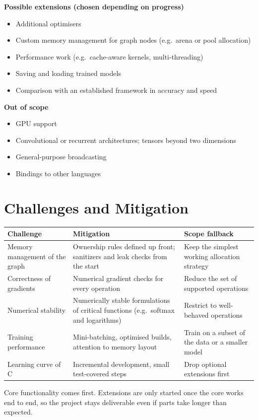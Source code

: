 \documentclass[11pt,a4paper]{article}
\begin{document}
\textbf{Possible extensions (chosen depending on progress)}
\begin{itemize}
  \item Additional optimisers
  \item Custom memory management for graph nodes (e.g.\ arena or pool allocation)
  \item Performance work (e.g.\ cache-aware kernels, multi-threading)
  \item Saving and loading trained models
  \item Comparison with an established framework in accuracy and speed
\end{itemize}

\textbf{Out of scope}
\begin{itemize}
  \item GPU support
  \item Convolutional or recurrent architectures; tensors beyond two dimensions
  \item General-purpose broadcasting
  \item Bindings to other languages
\end{itemize}

\section{Challenges and Mitigation}

{\small
\begin{longtable}{@{}L{0.27\textwidth} L{0.33\textwidth} L{0.34\textwidth}@{}}
\toprule
\textbf{Challenge} & \textbf{Mitigation} & \textbf{Scope fallback} \\
\midrule
\endhead
Memory management of the graph
  & Ownership rules defined up front; sanitizers and leak checks from the start
  & Keep the simplest working allocation strategy \\
Correctness of gradients
  & Numerical gradient checks for every operation
  & Reduce the set of supported operations \\
Numerical stability
  & Numerically stable formulations of critical functions (e.g.\ softmax and
    logarithms)
  & Restrict to well-behaved operations \\
Training performance
  & Mini-batching, optimised builds, attention to memory layout
  & Train on a subset of the data or a smaller model \\
Learning curve of C
  & Incremental development, small test-covered steps
  & Drop optional extensions first \\
\bottomrule
\end{longtable}
}

Core functionality comes first. Extensions are only started once the core
works end to end, so the project stays deliverable even if parts take longer
than expected.
\end{document}
